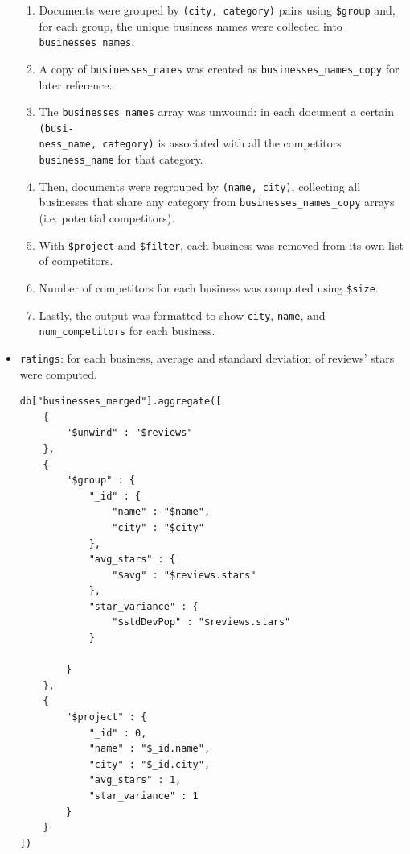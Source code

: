 \documentclass{Configuration_Files/PoliMi3i_thesis}
\begin{document}
\begin{itemize}
\begin{enumerate}
\item Documents were grouped by \texttt{(city, category)} pairs using \texttt{\$group} and, for each group, the unique business names were collected into \texttt{businesses\_names}.

\item A copy of \texttt{businesses\_names} was created as \texttt{businesses\_names\_copy} for later reference.

\item The \texttt{businesses\_names} array was unwound: in each document a certain \texttt{(busi-\\ness\_name, category)} is associated with all the competitors \texttt{business\_name} for that category.

\item Then, documents were regrouped by \texttt{(name, city)}, collecting all businesses that share any category  from \texttt{businesses\_names\_copy} arrays (i.e. potential competitors).

\item With \texttt{\$project} and \texttt{\$filter}, each business was removed from its own list of competitors.

\item Number of competitors for each business was computed using \texttt{\$size}.

\item Lastly, the output was formatted to show \texttt{city}, \texttt{name}, and \texttt{num\_competitors} for each business.

\end{enumerate}

\item \texttt{ratings}: for each business, average and standard deviation of reviews' stars were computed. 

\bigskip

\begin{lstlisting}[style=mongodb]
db["businesses_merged"].aggregate([
    {
        "$unwind" : "$reviews" 
    },
    {
        "$group" : {
            "_id" : {
                "name" : "$name", 
                "city" : "$city" 
            },
            "avg_stars" : {
                "$avg" : "$reviews.stars" 
            },
            "star_variance" : {
                "$stdDevPop" : "$reviews.stars"
            }

        }
    },
    {
        "$project" : {
            "_id" : 0,
            "name" : "$_id.name",
            "city" : "$_id.city",
            "avg_stars" : 1,
            "star_variance" : 1
        }
    }
])

\end{lstlisting}

\bigskip

\end{itemize}
\end{document}
